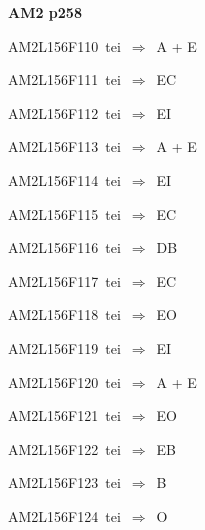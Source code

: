 \par\vfill\eject
{\bf\hfill AM2 p258\hfill\hbox{}}\par\bigskip
{\sixrm AM2L156F110\ {\sixit tei}\ }$\Rightarrow$\ {\tenit A} + {\tenit E}\par\smallskip
{\sixrm AM2L156F111\ {\sixit tei}\ }$\Rightarrow$\ EC\par\smallskip
{\sixrm AM2L156F112\ {\sixit tei}\ }$\Rightarrow$\ EI\par\smallskip
{\sixrm AM2L156F113\ {\sixit tei}\ }$\Rightarrow$\ {\tenit A} + {\tenit E}\par\smallskip
{\sixrm AM2L156F114\ {\sixit tei}\ }$\Rightarrow$\ EI\par\smallskip
{\sixrm AM2L156F115\ {\sixit tei}\ }$\Rightarrow$\ EC\par\smallskip
{\sixrm AM2L156F116\ {\sixit tei}\ }$\Rightarrow$\ DB\par\smallskip
{\sixrm AM2L156F117\ {\sixit tei}\ }$\Rightarrow$\ EC\par\smallskip
{\sixrm AM2L156F118\ {\sixit tei}\ }$\Rightarrow$\ EO\par\smallskip
{\sixrm AM2L156F119\ {\sixit tei}\ }$\Rightarrow$\ EI\par\smallskip
{\sixrm AM2L156F120\ {\sixit tei}\ }$\Rightarrow$\ {\tenit A} + {\tenit E}\par\smallskip
{\sixrm AM2L156F121\ {\sixit tei}\ }$\Rightarrow$\ EO\par\smallskip
{\sixrm AM2L156F122\ {\sixit tei}\ }$\Rightarrow$\ EB\par\smallskip
{\sixrm AM2L156F123\ {\sixit tei}\ }$\Rightarrow$\ B\par\smallskip
{\sixrm AM2L156F124\ {\sixit tei}\ }$\Rightarrow$\ O\par\smallskip

